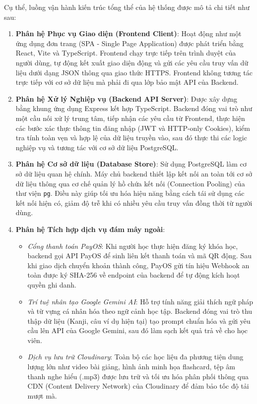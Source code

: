 \documentclass[../DoAn.tex]{subfiles}
\begin{document}
Cụ thể, luồng vận hành kiến trúc tổng thể của hệ thống được mô tả chi tiết như sau:
\begin{enumerate}
    \item \textbf{Phân hệ Phục vụ Giao diện (Frontend Client)}: Hoạt động như một ứng dụng đơn trang (SPA - Single Page Application) được phát triển bằng React, Vite và TypeScript. Frontend chạy trực tiếp trên trình duyệt của người dùng, tự động kết xuất giao diện động và gửi các yêu cầu truy vấn dữ liệu dưới dạng JSON thông qua giao thức HTTPS. Frontend không tương tác trực tiếp với cơ sở dữ liệu mà phải đi qua lớp bảo mật API của Backend.
    \item \textbf{Phân hệ Xử lý Nghiệp vụ (Backend API Server)}: Được xây dựng bằng khung ứng dụng Express kết hợp TypeScript. Backend đóng vai trò như một cầu nối xử lý trung tâm, tiếp nhận các yêu cầu từ Frontend, thực hiện các bước xác thực thông tin đăng nhập (JWT và HTTP-only Cookies), kiểm tra tính toàn vẹn và hợp lệ của dữ liệu truyền vào, sau đó thực thi các logic nghiệp vụ và tương tác với cơ sở dữ liệu PostgreSQL.
    \item \textbf{Phân hệ Cơ sở dữ liệu (Database Store)}: Sử dụng PostgreSQL làm cơ sở dữ liệu quan hệ chính. Máy chủ backend thiết lập kết nối an toàn tới cơ sở dữ liệu thông qua cơ chế quản lý hồ chứa kết nối (Connection Pooling) của thư viện \texttt{pg}. Điều này giúp tối ưu hóa hiệu năng bằng cách tái sử dụng các kết nối hiện có, giảm độ trễ khi có nhiều yêu cầu truy vấn đồng thời từ người dùng.
    \item \textbf{Phân hệ Tích hợp dịch vụ đám mây ngoài}:
    \begin{itemize}
        \item \textit{Cổng thanh toán PayOS}: Khi người học thực hiện đăng ký khóa học, backend gọi API PayOS để sinh liên kết thanh toán và mã QR động. Sau khi giao dịch chuyển khoản thành công, PayOS gửi tín hiệu Webhook an toàn được ký SHA-256 về endpoint của backend để tự động kích hoạt quyền ghi danh.
        \item \textit{Trí tuệ nhân tạo Google Gemini AI}: Hỗ trợ tính năng giải thích ngữ pháp và từ vựng cá nhân hóa theo ngữ cảnh học tập. Backend đóng vai trò thu thập dữ liệu (Kanji, câu ví dụ hiện tại) tạo prompt chuẩn hóa và gửi yêu cầu lên API của Google Gemini, sau đó làm sạch kết quả trả về cho học viên.
        \item \textit{Dịch vụ lưu trữ Cloudinary}: Toàn bộ các học liệu đa phương tiện dung lượng lớn như video bài giảng, hình ảnh minh họa flashcard, tệp âm thanh nghe hiểu (.mp3) được lưu trữ và tối ưu hóa phân phối thông qua CDN (Content Delivery Network) của Cloudinary để đảm bảo tốc độ tải mượt mà.
    \end{itemize}
\end{enumerate}
\end{document}
